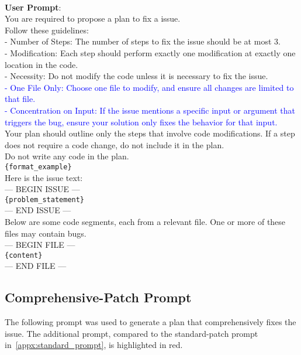 \begin{tcolorbox}[colback=white, colframe=black]
\\
\textbf{User Prompt}:\\
You are required to propose a plan to fix a issue. \\
Follow these guidelines:\\
- Number of Steps: The number of steps to fix the issue should be at most 3.\\ 
- Modification: Each step should perform exactly one modification at exactly one location in the code.\\
- Necessity: Do not modify the code unless it is necessary to fix the issue.\\
\textcolor{blue}{- One File Only: Choose one file to modify, and ensure all changes are limited to that file.}\\
\textcolor{blue}{- Concentration on Input: If the issue mentions a specific input or argument that triggers the bug, ensure your solution only fixes the behavior for that input. }\\
Your plan should outline only the steps that involve code modifications. If a step does not require a code change, do not include it in the plan.\\
Do not write any code in the plan.\\

\texttt{\{format\_example\}}\\

Here is the issue text:\\
--- BEGIN ISSUE ---\\
\texttt{\{problem\_statement\}}\\
--- END ISSUE ---\\

Below are some code segments, each from a relevant file. One or more of these files may contain bugs.\\
--- BEGIN FILE ---\\
\texttt{\{content\}}\\
--- END FILE ---\\
\end{tcolorbox}


\subsection{Comprehensive-Patch Prompt}
The following prompt was used to generate a plan that comprehensively fixes the issue. The additional prompt, compared to the standard-patch prompt in~\cref{appx:standard_prompt}, is highlighted in red.

